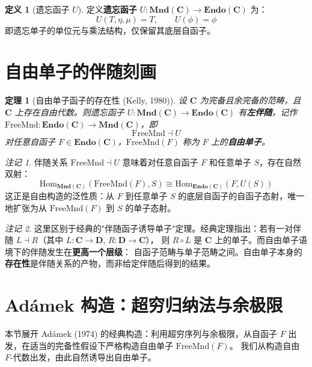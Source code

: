 \documentclass[UTF8,a4paper,12pt]{ctexart}
\theoremstyle{definition}
\newtheorem{definition}{定义}[section]
\theoremstyle{plain}
\newtheorem{theorem}{定理}[section]
\theoremstyle{remark}
\newtheorem{remark}{注记}[section]
\newcommand{\cat}[1]{\mathbf{#1}}
\newcommand{\Hom}{\mathrm{Hom}}
\newcommand{\dashvadj}{\dashv}
\newcommand{\Endo}{\mathbf{Endo}}
\newcommand{\Mnd}{\mathbf{Mnd}}
\newcommand{\FreeMnd}{\mathrm{FreeMnd}}
\begin{document}
\begin{definition}[遗忘函子 $U$]
定义\textbf{遗忘函子} $U: \Mnd(\cat{C}) \to \Endo(\cat{C})$ 为：
\[
U(T, \eta, \mu) = T, \qquad U(\phi) = \phi
\]
即遗忘单子的单位元与乘法结构，仅保留其底层自函子。
\end{definition}

\section{自由单子的伴随刻画}

\begin{theorem}[自由单子函子的存在性 (Kelly, 1980)]
设 $\cat{C}$ 为完备且余完备的范畴，且 $\cat{C}$ 上存在自由代数。则遗忘函子 $U: \Mnd(\cat{C}) \to \Endo(\cat{C})$ 
有\textbf{左伴随}，记作 $\FreeMnd: \Endo(\cat{C}) \to \Mnd(\cat{C})$，即
\[
\FreeMnd \dashvadj U
\]
对任意自函子 $F \in \Endo(\cat{C})$，$\FreeMnd(F)$ 称为 $F$ 上的\textbf{自由单子}。
\end{theorem}

\begin{remark}
伴随关系 $\FreeMnd \dashvadj U$ 意味着对任意自函子 $F$ 和任意单子 $S$，存在自然双射：
\[
\Hom_{\Mnd(\cat{C})}(\FreeMnd(F), S) \cong \Hom_{\Endo(\cat{C})}(F, U(S))
\]
这正是自由构造的泛性质：从 $F$ 到任意单子 $S$ 的底层自函子的自函子态射，唯一地扩张为从 $\FreeMnd(F)$ 到 $S$ 的单子态射。
\end{remark}

\begin{remark}
这里区别于经典的"伴随函子诱导单子"定理。经典定理指出：若有一对伴随 $L \dashvadj R$（其中 $L: \cat{C} \to \cat{D}$, $R: \cat{D} \to \cat{C}$），
则 $R \circ L$ 是 $\cat{C}$ 上的单子。而自由单子语境下的伴随发生在\textbf{更高一个层级}：
自函子范畴与单子范畴之间。自由单子本身的\textbf{存在性}是伴随关系的产物，而非给定伴随后得到的结果。
\end{remark}

\section{Adámek 构造：超穷归纳法与余极限}

本节展开 Adámek (1974) 的经典构造：利用超穷序列与余极限，从自函子 $F$ 出发，在适当的完备性假设下严格构造自由单子 $\FreeMnd(F)$。
我们从构造自由 $F$-代数出发，由此自然诱导出自由单子。
\end{document}
